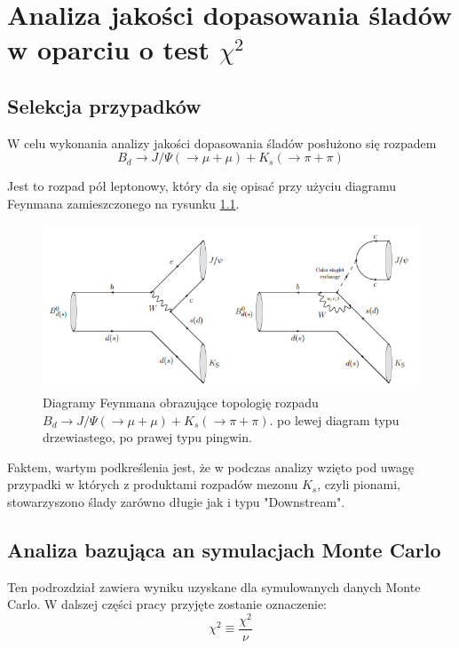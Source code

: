 \chapter{Analiza jakości dopasowania śladów w oparciu o test $\chi^2$}
\section{Selekcja przypadków}
W celu wykonania analizy jakości dopasowania śladów posłużono się rozpadem 
\begin{equation}
B_d \rightarrow J/\Psi(\rightarrow \mu +\mu) + K_s(\rightarrow \pi + \pi )
\end{equation}

Jest to rozpad pół leptonowy, który da się opisać przy użyciu diagramu Feynmana zamieszczonego na rysunku \ref{rys:BJPsi}.

 \begin{figure}[h]
 \centering
 \includegraphics[scale=0.8]{rozdzial6/Feynman.png}
 \caption{Diagramy Feynmana obrazujące topologię rozpadu $B_d \rightarrow J/\Psi(\rightarrow \mu +\mu) + K_s(\rightarrow \pi + \pi )$. po lewej diagram typu drzewiastego, po prawej typu pingwin. }
 \label{rys:BJPsi}
\end{figure}

Faktem, wartym podkreślenia jest, że w podczas analizy wzięto pod uwagę przypadki w których z produktami rozpadów mezonu $K_s$, czyli pionami, stowarzyszono ślady zarówno długie jak i typu "Downstream".
\section{Analiza bazująca an symulacjach Monte Carlo} 
Ten podrozdział zawiera wyniku uzyskane dla symulowanych danych Monte Carlo. 
W dalszej części pracy przyjęte zostanie oznaczenie:
\begin{equation}
\chi^2 \equiv \frac{\chi^2}{\nu} 
\end{equation}

